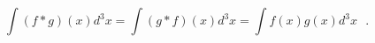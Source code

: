\begin{equation}
\int (f*g)(x) d^{3}x = \int (g*f)(x) d^{3}x = \int f(x)g(x)d^{3}x ~~~.
\end{equation}


